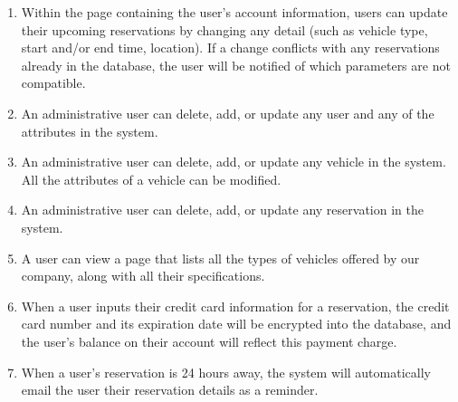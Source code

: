 \documentclass{article}
\begin{document}
\begin{enumerate}
\item Within the page containing the user's account information, users can update their upcoming reservations by changing any detail (such as vehicle type, start and/or end time, location). If a change conflicts with any reservations already in the database, the user will be notified of which parameters are not compatible.

\item An administrative user can delete, add, or update any user and any of the attributes in the system.

\item An administrative user can delete, add, or update any vehicle in the system. All the attributes of a vehicle can be modified.

\item An administrative user can delete, add, or update any reservation in the system.

\item A user can view a page that lists all the types of vehicles offered by our company, along with all their specifications.

\item When a user inputs their credit card information for a reservation, the credit card number and its expiration date will be encrypted into the database, and the user's balance on their account will reflect this payment charge.

\item When a user's reservation is 24 hours away, the system will automatically email the user their reservation details as a reminder.



\end{enumerate}
\end{document}
